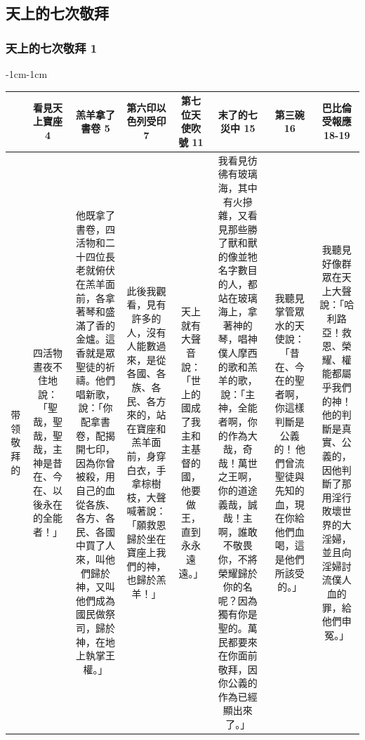 \subsection{天上的七次敬拜}

\subsubsection{天上的七次敬拜 1}
\begin{changemargin}{-1cm}{-1cm}
\begin{table} %
\centering
\begin{tabular}{cccccccc}\hline
&看見天上寶座  4 & 羔羊拿了書卷 5 & 第六印以色列受印  7&第七位天使吹號 11 &末了的七災中 15&第三碗 16 & 巴比倫受報應 18-19 \\\hline
\multicolumn{1}{m{.3cm}|}{带领敬拜的}&
\multicolumn{1}{m{3cm}|}{四活物晝夜不住地說：「聖哉，聖哉，聖哉，主神是昔在、今在、以後永在的全能者！」}  &
\multicolumn{1}{m{3.5cm}|}{他既拿了書卷，四活物和二十四位長老就俯伏在羔羊面前，各拿著琴和盛滿了香的金爐。這香就是眾聖徒的祈禱。他們唱新歌，說：「你配拿書卷，配揭開七印，因為你曾被殺，用自己的血從各族、各方、各民、各國中買了人來，叫他們歸於神，又叫他們成為國民做祭司，歸於神，在地上執掌王權。」}  &
 \multicolumn{1}{m{3.5cm}|}{此後我觀看，見有許多的人，沒有人能數過來，是從各國、各族、各民、各方來的，站在寶座和羔羊面前，身穿白衣，手拿棕樹枝，大聲喊著說：「願救恩歸於坐在寶座上我們的神，也歸於羔羊！」} &
 \multicolumn{1}{m{3cm}|}{天上就有大聲音說：「世上的國成了我主和主基督的國，他要做王，直到永永遠遠。」}  &
 \multicolumn{1}{m{4cm}|}{我看見彷彿有玻璃海，其中有火摻雜，又看見那些勝了獸和獸的像並牠名字數目的人，都站在玻璃海上，拿著神的琴，唱神僕人摩西的歌和羔羊的歌，說：「主神，全能者啊，你的作為大哉，奇哉！萬世之王啊，你的道途義哉，誠哉！主啊，誰敢不敬畏你，不將榮耀歸於你的名呢？因為獨有你是聖的。萬民都要來在你面前敬拜，因你公義的作為已經顯出來了。」}   &
 \multicolumn{1}{m{2cm}|}{我聽見掌管眾水的天使說：「昔在、今在的聖者啊，你這樣判斷是公義的！ 他們曾流聖徒與先知的血，現在你給他們血喝，這是他們所該受的。」}  &  
 \multicolumn{1}{m{4cm}|}{我聽見好像群眾在天上大聲說：「哈利路亞！救恩、榮耀、權能都屬乎我們的神！他的判斷是真實、公義的，因他判斷了那用淫行敗壞世界的大淫婦，並且向淫婦討流僕人血的罪，給他們申冤。」 } \\\hline
 

\end{tabular}
\end{table}
\end{changemargin}
